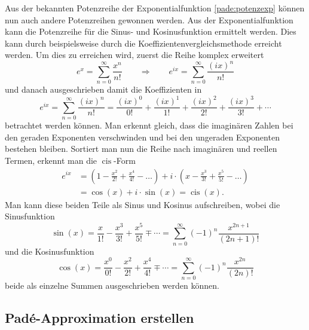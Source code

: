 \begin{beispiel}
Aus der bekannten Potenzreihe der Exponentialfunktion \eqref{pade:potenzexp} können nun auch andere Potenzreihen gewonnen werden.
Aus der Exponentialfunktion kann die Potenzreihe für die Sinus- und
Kosinusfunktion ermittelt werden.
Dies kann durch beispielsweise durch die Koeffizientenvergleichsmethode
erreicht werden. 
Um dies zu erreichen wird, zuerst die Reihe komplex erweitert
\begin{equation*}
e^{x}
=
\sum_{n=0}^{\infty} \frac{x^{n}}{n !}
\qquad\Rightarrow\qquad
e^{ix}
=
\sum_{n=0}^{\infty} \frac{(ix)^{n}}{n !}
\end{equation*}
und danach ausgeschrieben damit die Koeffizienten  in
\begin{equation}
e^{ix}
=
\sum_{n=0}^{\infty} \frac{(ix)^{n}}{n !}
=
\frac{(ix)^{0}}{0 !}+\frac{(ix)^{1}}{1 !}+\frac{(ix)^{2}}{2 !}+\frac{(ix)^{3}}{3 !}+\cdots
\end{equation}
betrachtet werden können.
Man erkennt gleich, dass die imaginären Zahlen bei den geraden Exponenten
verschwinden und bei den ungeraden Exponenten bestehen bleiben. 
Sortiert man nun die Reihe nach imaginären und reellen Termen, erkennt
man die $\operatorname{cis}$-Form 
\begin{align*}
e^{ix}
&=
\left(1-\frac{x^{2}}{2 !}+\frac{x^{4}}{4 !}-\ldots\right)+i \cdot\left(x-\frac{x^{3}}{3 !}+\frac{x^{5}}{5 !}-\ldots\right)
\\
&=
\cos(x)+i\cdot \sin(x) = \operatorname{cis}(x).
\end{align*}
Man kann diese beiden Teile als Sinus und Kosinus aufschreiben,
wobei die Sinusfunktion 
\begin{equation*}
\sin (x)
=
\frac{x}{1 !}-\frac{x^{3}}{3 !}+\frac{x^{5}}{5 !} \mp \cdots
=
\sum_{n=0}^{\infty}(-1)^{n} \frac{x^{2 n+1}}{(2 n+1) !}
\end{equation*}
und die Kosinusfunktion 
\begin{equation*}
\cos (x)
=
\frac{x^{0}}{0 !}-\frac{x^{2}}{2 !}+\frac{x^{4}}{4 !} \mp \cdots
=
\sum_{n=0}^{\infty}(-1)^{n} \frac{x^{2 n}}{(2 n) !}
\end{equation*}
beide als einzelne Summen ausgeschrieben werden können.
\end{beispiel}


\subsection{Padé-Approximation erstellen
	\label{pade:subsection:Pade_erstellen}}

